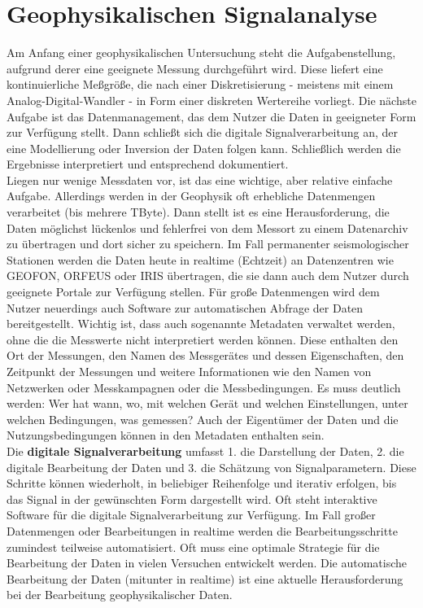 \section{Geophysikalischen Signalanalyse}
Am Anfang einer geophysikalischen Untersuchung steht die Aufgabenstellung, aufgrund derer eine geeignete Messung durchgeführt wird. Diese liefert eine kontinuierliche Meßgröße, die nach einer Diskretisierung - meistens mit einem Analog-Digital-Wandler - in Form einer diskreten Wertereihe vorliegt. Die nächste Aufgabe ist das Datenmanagement, das dem Nutzer die Daten in geeigneter Form zur Verfügung stellt. Dann schließt sich die digitale Signalverarbeitung an, der eine Modellierung oder Inversion der Daten folgen kann. Schließlich werden die Ergebnisse interpretiert und entsprechend dokumentiert.\\

Liegen nur wenige Messdaten vor, ist das eine wichtige, aber relative einfache Aufgabe. Allerdings werden in der Geophysik oft erhebliche Datenmengen verarbeitet (bis mehrere TByte). Dann stellt ist es eine Herausforderung, die Daten möglichst lückenlos und fehlerfrei von dem Messort zu einem Datenarchiv zu übertragen und dort sicher zu speichern. Im Fall permanenter seismologischer Stationen werden die Daten heute in realtime (Echtzeit) an Datenzentren wie GEOFON, ORFEUS oder IRIS übertragen, die sie dann auch dem Nutzer durch geeignete Portale zur Verfügung stellen. Für große Datenmengen wird dem Nutzer neuerdings auch Software zur automatischen Abfrage der Daten bereitgestellt. Wichtig ist, dass auch sogenannte Metadaten verwaltet werden, ohne die die Messwerte nicht interpretiert werden können. Diese enthalten den Ort der Messungen, den Namen des Messgerätes und dessen Eigenschaften, den Zeitpunkt der Messungen und weitere Informationen wie den Namen von Netzwerken oder Messkampagnen oder die Messbedingungen. Es muss deutlich werden: Wer hat wann, wo, mit welchen Gerät und welchen Einstellungen, unter welchen Bedingungen, was gemessen? Auch der Eigentümer der Daten und die Nutzungsbedingungen können in den Metadaten enthalten sein.\\

Die \textbf{digitale Signalverarbeitung} umfasst 1. die Darstellung der Daten, 2. die digitale Bearbeitung der Daten und 3. die Schätzung von Signalparametern. Diese Schritte können wiederholt, in beliebiger Reihenfolge und iterativ erfolgen, bis das Signal in der gewünschten Form dargestellt wird. Oft steht interaktive Software für die digitale Signalverarbeitung zur Verfügung. Im Fall großer Datenmengen oder Bearbeitungen in realtime werden die Bearbeitungsschritte zumindest teilweise automatisiert. Oft muss eine optimale Strategie für die Bearbeitung der Daten in vielen Versuchen entwickelt werden. Die automatische Bearbeitung der Daten (mitunter in realtime) ist eine aktuelle Herausforderung bei der Bearbeitung geophysikalischer Daten.

